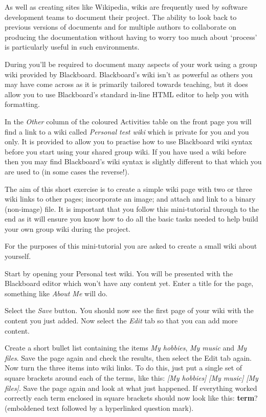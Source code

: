 \begin{firstonly}
As well as creating sites like Wikipedia, wikis are frequently used by software development teams to document their project. The ability to look back to previous versions of documents and for multiple authors to collaborate on producing the documentation without having to worry too much about `process' is particularly useful in such environments.

During  you'll be required to document many aspects of your work using a group wiki provided by Blackboard. Blackboard's wiki isn't as powerful as others you may have come across as it is primarily tailored towards teaching, but it does allow you to use Blackboard's standard in-line HTML editor to help you with formatting.

In the \emph{Other} column of the coloured Activities table on the  front page you will find a link to a wiki called \emph{Personal test wiki} which is private for you and you only. It is provided to allow you to practise how to use Blackboard wiki syntax before you start using your shared group wiki. If you have used a wiki before then you may find Blackboard's wiki syntax is slightly different to that which you are used to (in some cases the reverse!).


The aim of this short exercise is to create a simple wiki page with two or three wiki links to other pages; incorporate an image; and attach and link to a binary (non-image) file. It is important that you follow this mini-tutorial through to the end as it will ensure you know how to do all the basic tasks needed to help build your own group wiki during the project.

For the purposes of this mini-tutorial you are asked to create a small wiki about yourself.

Start by opening your Personal test wiki. You will be presented with the Blackboard editor which won't have any content yet. Enter a title for the page, something like \emph{About Me} will do.

Select the \emph{Save} button. You should now see the first page of your wiki with the content you just added. Now select the \emph{Edit} tab so that you can add more content.

Create a short bullet list containing the items \emph{My hobbies},  \emph{My music}  and \emph{My files}.  Save the page again and check the results, then select the Edit tab again. Now turn the three items into wiki links. To do this, just put a single set of square brackets around each of the terms, like this: \emph{[My hobbies]}  \emph{[My music]}  \emph{[My files]}.  Save the page again and look at what just happened. If everything worked correctly each term enclosed in square brackets should now look like this: \textbf{term}? (emboldened text followed by a hyperlinked question mark).


\end{firstonly}
